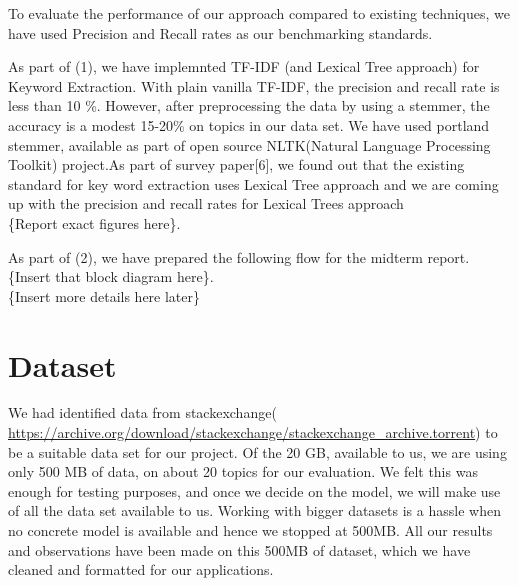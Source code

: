 \documentclass[dvips,12pt]{article}
\begin{document}
		To evaluate the performance of our approach compared to existing techniques, we have used Precision and Recall rates as our benchmarking standards.
		  
		As part of (1), we have implemnted TF-IDF (and Lexical Tree approach) for Keyword Extraction. With plain vanilla TF-IDF, the precision and recall rate is less than 10 \%. However, after preprocessing the data by using a stemmer, the accuracy is a modest 15-20\% on topics in our data set.
		We have used portland stemmer, available as part of open source NLTK(Natural Language Processing Toolkit) project.As part of survey paper[6], we found out that the existing standard for key word extraction uses Lexical Tree approach and we are coming up with the precision and recall rates for Lexical Trees approach \\\{Report exact figures here\}.
		
		As part of (2), we have prepared the following flow for the midterm report.
		\\\{Insert that block diagram here\}. 
		\\\{Insert more details here later\}
		
	\section{Dataset}
		We had identified data from stackexchange( \url{https://archive.org/download/stackexchange/stackexchange_archive.torrent}) to be a suitable data set for our project. 
		Of the 20 GB, available to us, we are using only 500 MB of data, on about 20 topics for our evaluation. We felt this was enough for testing purposes, and once we decide on the model, we will make use of all the data set available to us. Working with bigger datasets is a hassle when no concrete model is available and hence we stopped at 500MB.
		All our results and observations have been made on this 500MB of dataset, which we have cleaned and formatted for our applications. 
	
\end{document}
